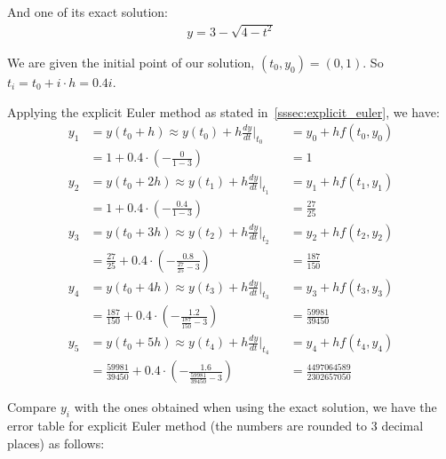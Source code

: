 \documentclass[a4paper]{article}
\numberwithin{equation}{section}
\begin{document}
And one of its exact solution:
\begin{align*}
  y = 3 - \sqrt{4-t^2}
\end{align*}

We are given the initial point of our solution, \( (t_0, y_0) = (0, 1) \). So \( t_i = t_0 + i \cdot h = 0.4i \).

Applying the explicit Euler method as stated in~\ref{sssec:explicit_euler}, we have:
\begin{align*}
  y_1 & = y(t_0 + h) \approx y(t_0) + h\frac{dy}{dt}\biggr|_{t_0}                           &  & = y_0 + hf(t_0, y_0)            \\
      & = 1 + 0.4 \cdot \left(-\frac{0}{1-3}\right)                                         &  & = 1                             \\
  y_2 & = y(t_0 + 2h) \approx y(t_1) + h\frac{dy}{dt}\biggr|_{t_1}                          &  & = y_1 + hf(t_1, y_1)            \\
      & = 1 + 0.4 \cdot \left(-\frac{0.4}{1-3}\right)                                       &  & = \frac{27}{25}                 \\
  y_3 & = y(t_0 + 3h) \approx y(t_2) + h\frac{dy}{dt}\biggr|_{t_2}                          &  & = y_2 + hf(t_2, y_2)            \\
      & = \frac{27}{25} + 0.4 \cdot \left(-\frac{0.8}{\frac{27}{25} - 3}\right)             &  & = \frac{187}{150}               \\
  y_4 & = y(t_0 + 4h) \approx y(t_3) + h\frac{dy}{dt}\biggr|_{t_3}                          &  & = y_3 + hf(t_3, y_3)            \\
      & = \frac{187}{150} + 0.4 \cdot \left(-\frac{1.2}{\frac{187}{150} - 3}\right)         &  & = \frac{59981}{39450}           \\
  y_5 & = y(t_0 + 5h) \approx y(t_4) + h\frac{dy}{dt}\biggr|_{t_4}                          &  & = y_4 + hf(t_4, y_4)            \\
      & = \frac{59981}{39450} + 0.4 \cdot \left(-\frac{1.6}{\frac{59981}{39450} - 3}\right) &  & = \frac{4497064589}{2302657050}
\end{align*}

Compare \( y_i \) with the ones obtained when using the exact solution, we have the error table for explicit Euler method (the numbers are rounded to 3 decimal places) as follows:
\end{document}
